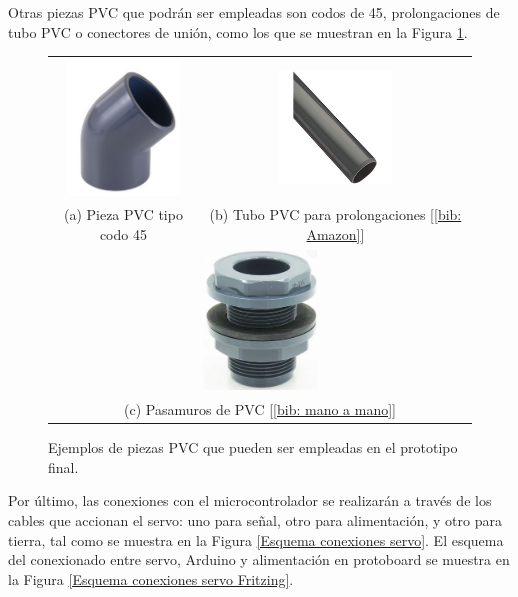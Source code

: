 \documentclass[12pt]{article}
\begin{document}
	\noindent Otras piezas PVC que podrán ser empleadas son codos de 45\degree, prolongaciones de tubo PVC o conectores de unión, como los que se muestran en la Figura \ref{fig: piezas PVC posibles.}.\\
	
	\begin{figure}[h]
		\begin{center}
			\begin{tabular}{cc}
				\includegraphics[width=30mm]{img/pieza_pvc_codo45.png} &   \includegraphics[width=30mm]{img/tubo_pvc.jpg} \\
				(a) Pieza PVC tipo codo 45\degree [\ref{bib: Poolaria}] & (b) Tubo PVC para prolongaciones [\ref{bib: Amazon}]\\[6pt]
				\multicolumn{2}{c}{\includegraphics[width=30mm]{img/pasamuro_pvc.png} }\\
				\multicolumn{2}{c}{(c) Pasamuros de PVC [\ref{bib: mano a mano}]}
			\end{tabular}
			\caption{Ejemplos de piezas PVC que pueden ser empleadas en el prototipo final.}
			\label{fig: piezas PVC posibles.}
		\end{center}
	\end{figure}
	
	\pagebreak
	
	\noindent Por último, las conexiones con el microcontrolador se realizarán a través de los cables que accionan el servo: uno para señal, otro para alimentación, y otro para tierra, tal como se muestra en la Figura \ref{Esquema conexiones servo}. El esquema del conexionado entre servo, Arduino y alimentación en protoboard se muestra en la Figura \ref{Esquema conexiones servo Fritzing}.\\
	
\end{document}
